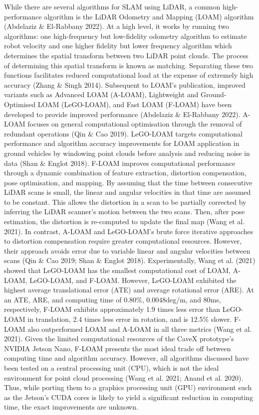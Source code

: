 While there are several algorithms for SLAM using LiDAR, a common high-performance algorithm is the LiDAR Odometry and Mapping (LOAM) algorithm (Abdelaziz \& El-Rabbany 2022). At a high level, it works by running two algorithms: one high-frequency but low-fidelity odometry algorithm to estimate robot velocity and one higher fidelity but lower frequency algorithm which determines the spatial transform between two LiDAR point clouds. The process of determining this spatial transform is known as matching. Separating these two functions facilitates reduced computational load at the expense of extremely high accuracy (Zhang \& Singh 2014). Subsequent to LOAM's publication, improved variants such as Advanced LOAM (A-LOAM), Lightweight and Ground-Optimised LOAM (LeGO-LOAM), and Fast LOAM (F-LOAM) have been developed to provide improved performance (Abdelaziz \& El-Rabbany 2022). A-LOAM focuses on general computational optimisation through the removal of redundant operations (Qin \& Cao 2019). LeGO-LOAM targets computational performance and algorithm accuracy improvements for LOAM application in ground vehicles by windowing point clouds before analysis and reducing noise in data (Shan \& Englot 2018). F-LOAM improves computational performance through a dynamic combination of feature extraction, distortion compensation, pose optimisation, and mapping. By assuming that the time between consecutive LiDAR scans is small, the linear and angular velocities in that time are assumed to be constant. This allows the distortion in a scan to be partially corrected by inferring the LiDAR scanner's motion between the two scans. Then, after pose estimation, the distortion is re-computed to update the final map (Wang et al. 2021). In contrast, A-LOAM and LeGO-LOAM's brute force iterative approaches to distortion compensation require greater computational resources. However, their approach avoids error due to variable linear and angular velocities between scans (Qin \& Cao 2019; Shan \& Englot 2018). Experimentally, Wang et al. (2021) showed that LeGO-LOAM has the smallest computational cost of LOAM, A-LOAM, LeGO-LOAM, and F-LOAM. However, LeGO-LOAM exhibited the highest average translational error (ATE) and average rotational error (ARE). At an ATE, ARE, and computing time of 0.80\%, 0.0048deg/m, and 80ms, respectively,  F-LOAM exhibits approximately 1.9 times less error than LeGO-LOAM in translation, 2.4 times less error in rotation, and is 12.5\% slower. F-LOAM also outperformed LOAM and A-LOAM in all three metrics (Wang et al. 2021). Given the limited computational resources of the CaveX prototype's NVIDIA Jetson Nano, F-LOAM presents the most ideal trade off between computing time and algorithm accuracy. However, all algorithms discussed have been tested on a central processing unit (CPU), which is not the ideal environment for point cloud processing (Wang et al. 2021; Anand et al. 2020). Thus, while porting them to a graphics processing unit (GPU) environment such as the Jetson's CUDA cores is likely to yield a significant reduction in computing time, the exact improvements are unknown.

